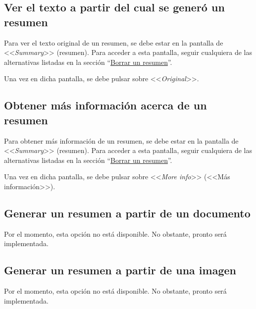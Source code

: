 \subsection{Ver el texto a partir del cual se generó un resumen}

Para ver el texto original de un resumen, se debe estar en la pantalla de <<\emph{Summary}>> (resumen). Para acceder a esta pantalla, seguir cualquiera de las alternativas listadas en la sección ``\hyperref[subsection:borrar]{Borrar un resumen}''.

Una vez en dicha pantalla, se debe pulsar sobre <<\emph{Original}>>.

\subsection{Obtener más información acerca de un resumen}

Para obtener más información de un resumen, se debe estar en la pantalla de <<\emph{Summary}>> (resumen). Para acceder a esta pantalla, seguir cualquiera de las alternativas listadas en la sección ``\hyperref[subsection:borrar]{Borrar un resumen}''.

Una vez en dicha pantalla, se debe pulsar sobre <<\emph{More info}>> (<<Más información>>).

\subsection{Generar un resumen a partir de un documento}

Por el momento, esta opción no está disponible. No obstante, pronto será implementada.

\subsection{Generar un resumen a partir de una imagen}

Por el momento, esta opción no está disponible. No obstante, pronto será implementada.